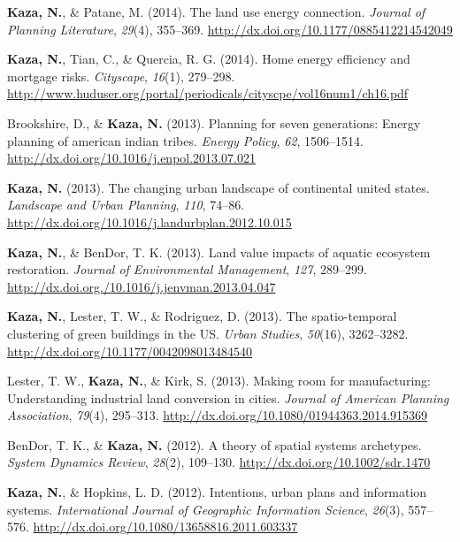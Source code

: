 \documentclass[11pt,a4paper,]{awesome-cv}
\newlength{\cslhangindent}
\newenvironment{CSLReferences}[2] %
 {\begin{list}{}{%
  \setlength{\itemindent}{0pt}
  \setlength{\leftmargin}{0pt}
  \setlength{\parsep}{0pt}
  \ifodd #1
   \setlength{\leftmargin}{\cslhangindent}
   \setlength{\itemindent}{-1\cslhangindent}
  \fi
  \setlength{\itemsep}{#2\baselineskip}}}
 {\end{list}}
\begin{document}
\begin{CSLReferences}{1}{0}
\textbf{Kaza, N.}, \& Patane, M. (2014). The land use energy connection.
\emph{Journal of Planning Literature}, \emph{29}(4), 355--369.
\url{http://dx.doi.org/10.1177/0885412214542049}

\textbf{Kaza, N.}, Tian, C., \& Quercia, R. G. (2014). Home energy
efficiency and mortgage risks. \emph{Cityscape}, \emph{16}(1), 279--298.
\url{http://www.huduser.org/portal/periodicals/cityscpe/vol16num1/ch16.pdf}

Brookshire, D., \& \textbf{Kaza, N.} (2013). Planning for seven
generations: Energy planning of american indian tribes. \emph{Energy
Policy}, \emph{62}, 1506--1514.
\url{http://dx.doi.org/10.1016/j.enpol.2013.07.021}

\textbf{Kaza, N.} (2013). The changing urban landscape of continental
united states. \emph{Landscape and Urban Planning}, \emph{110}, 74--86.
\url{http://dx.doi.org/10.1016/j.landurbplan.2012.10.015}

\textbf{Kaza, N.}, \& BenDor, T. K. (2013). Land value impacts of
aquatic ecosystem restoration. \emph{Journal of Environmental
Management}, \emph{127}, 289--299.
\url{http://dx.doi.org./10.1016/j.jenvman.2013.04.047}

\textbf{Kaza, N.}, Lester, T. W., \& Rodriguez, D. (2013). The
spatio-temporal clustering of green buildings in the US. \emph{Urban
Studies}, \emph{50}(16), 3262--3282.
\url{http://dx.doi.org/10.1177/0042098013484540}

Lester, T. W., \textbf{Kaza, N.}, \& Kirk, S. (2013). Making room for
manufacturing: Understanding industrial land conversion in cities.
\emph{Journal of American Planning Association}, \emph{79}(4), 295--313.
\url{http://dx.doi.org/10.1080/01944363.2014.915369}

BenDor, T. K., \& \textbf{Kaza, N.} (2012). A theory of spatial systems
archetypes. \emph{System Dynamics Review}, \emph{28}(2), 109--130.
\url{http://dx.doi.org/10.1002/sdr.1470}

\textbf{Kaza, N.}, \& Hopkins, L. D. (2012). Intentions, urban plans and
information systems. \emph{International Journal of Geographic
Information Science}, \emph{26}(3), 557--576.
\url{http://dx.doi.org/10.1080/13658816.2011.603337}


\end{CSLReferences}
\end{document}
